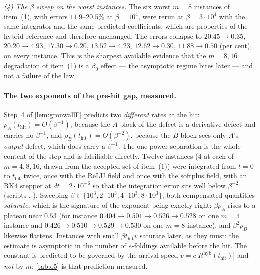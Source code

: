 \documentclass[11pt]{article}
\theoremstyle{definition}
\theoremstyle{remark}
\newcommand{\thit}{t_{\mathrm{hit}}}
\newcommand{\hyb}{\mathrm{hyb}}
\begin{document}
\emph{(4) The $\beta$ sweep on the worst instances.} The six worst $m=8$
instances of item~(1), with errors $11.9$--$20.5\%$ at $\beta=10^4$, were rerun
at $\beta=3\cdot10^4$ with the same integrator and the same predicted
coefficients, which are properties of the hybrid reference and therefore
unchanged. The errors collapse to
$20.45\to0.35$, $20.20\to4.93$, $17.30\to0.20$, $13.52\to4.23$,
$12.62\to0.30$, $11.88\to0.50$ (per cent), on every instance. This is the
sharpest available evidence that the $m=8,16$ degradation of item~(1) is a
$\beta_0$ effect --- the asymptotic regime bites later --- and not a failure of
the law.

\paragraph{The two exponents of the pre-hit gap, measured.} Step~4 of
\cref{lem:gronwallF} predicts two \emph{different} rates at the hit:
$\rho_A(\thit)=O(\beta^{-1})$, because the $A$-block of the defect is a
derivative defect and carries no $\beta^{-1}$, and $\rho_B(\thit)=O(\beta^{-2})$,
because the $B$-block sees only $A$'s \emph{output} defect, which does carry a
$\beta^{-1}$. The one-power separation is the whole content of the step and is
falsifiable directly. Twelve instances ($4$ at each of $m=4,8,16$, drawn from
the accepted set of item~(1)) were integrated from $t=0$ to $\thit$ twice, once
with the ReLU field and once with the softplus field, with an RK4 stepper at
$dt=2\cdot10^{-6}$ so that the integration error sits well below $\beta^{-2}$
(scripts , ). Sweeping
$\beta\in\{10^3,2\cdot10^3,4\cdot10^3,8\cdot10^3\}$, both compensated quantities
\emph{saturate}, which is the signature of the exponent being exactly right:
$\beta\rho_A$ rises to a plateau near $0.53$ (for instance
$0.404\to0.501\to0.526\to0.528$ on one $m=4$ instance and
$0.426\to0.510\to0.529\to0.530$ on one $m=8$ instance), and $\beta^2\rho_B$
likewise flattens. Instances with small $\beta\thit v$ saturate later, as they
must: the estimate is asymptotic in the number of $e$-foldings available before
the hit. The constant is predicted to be governed by the arrival speed
$v=c|R^{\hyb}(\thit)|$ and \emph{not} by $m$; \cref{tab:o5} is that
prediction measured.
\end{document}
